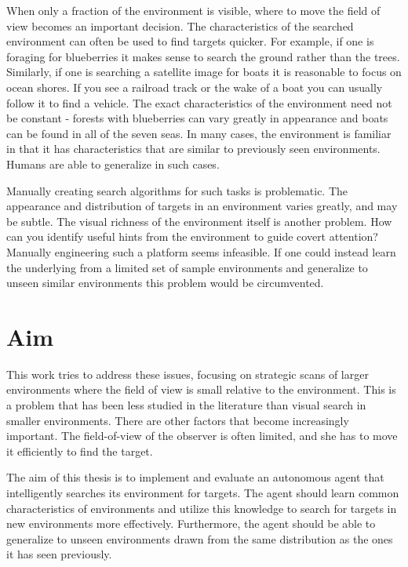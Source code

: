 When only a fraction of the environment is visible, where to move the field of view becomes an important decision.
The characteristics of the searched environment can often be used to find targets quicker.
For example, if one is foraging for blueberries it makes sense to search the ground rather than the trees.
Similarly, if one is searching a satellite image for boats it is reasonable to focus on ocean shores.
If you see a railroad track or the wake of a boat you can usually follow it to find a vehicle.
The exact characteristics of the environment need not be constant - forests with blueberries can vary greatly in appearance and boats can be found in all of the seven seas.
In many cases, the environment is familiar in that it has characteristics that are similar to previously seen environments.
Humans are able to generalize in such cases.

Manually creating search algorithms for such tasks is problematic.
The appearance and distribution of targets in an environment varies greatly, and may be subtle.
The visual richness of the environment itself is another problem.
How can you identify useful hints from the environment to guide covert attention?
Manually engineering such a platform seems infeasible.
If one could instead learn the underlying from a limited set of sample environments and generalize to unseen similar environments this problem would be circumvented.



\section{Aim}
\label{sec:aim}

This work tries to address these issues, focusing on strategic scans of larger environments where the field of view is small relative to the environment.
This is a problem that has been less studied in the literature than visual search in smaller environments.
There are other factors that become increasingly important. The field-of-view of the observer is often limited, and she has to move it efficiently to find the target.

The aim of this thesis is to implement and evaluate an autonomous agent that intelligently searches its environment for targets.
The agent should learn common characteristics of environments and utilize this knowledge to search for targets in new environments more effectively.
Furthermore, the agent should be able to generalize to unseen environments drawn from the same distribution as the ones it has seen previously.

